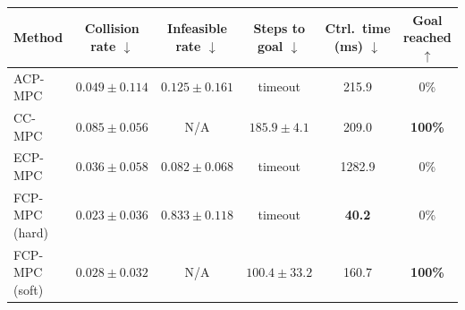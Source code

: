 \begin{tabular}{lccccc}
\hline
Method &
Collision rate $\downarrow$ &
Infeasible rate $\downarrow$ &
Steps to goal $\downarrow$ &
Ctrl.\ time (ms) $\downarrow$ &
Goal reached $\uparrow$ \\
\hline
ACP-MPC~\cite{dixit2023adaptive}
& $0.049\pm0.114$
& $0.125\pm0.161$
& timeout
& 215.9
& 0\% \\
CC-MPC~\cite{lekeufack2024decision}
& $0.085\pm0.056$
& N/A
& $185.9\pm4.1$
& 209.0
& \textbf{100\%} \\
ECP-MPC~\cite{shin2025egocentric}
& $0.036\pm0.058$
& $\mathbf{0.082}\pm0.068$
& timeout
& 1282.9
& 0\% \\
FCP-MPC (hard)
& $\mathbf{0.023}\pm0.036$
& $0.833\pm0.118$
& timeout
& \textbf{40.2}
& 0\% \\
FCP-MPC (soft)
& $0.028\pm0.032$
& N/A
& $\mathbf{100.4}\pm33.2$
& 160.7
& \textbf{100\%} \\
\hline
\end{tabular}
